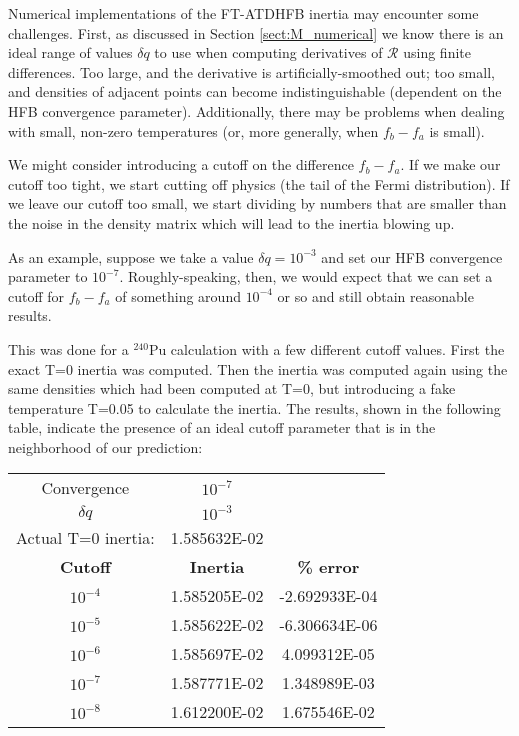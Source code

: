 Numerical implementations of the FT-ATDHFB inertia may encounter some challenges. First,  as discussed in Section \ref{sect:M_numerical} we know there is an ideal range of values $\delta q$ to use when computing derivatives of $\mathcal{R}$ using finite differences. Too large, and the derivative is artificially-smoothed out; too small, and densities of adjacent points can become indistinguishable (dependent on the HFB convergence parameter). Additionally, there may be problems when dealing with small, non-zero temperatures (or, more generally, when $f_b-f_a$ is small).
%
%

We might consider introducing a cutoff on the difference $f_b-f_a$. If we make our cutoff too tight, we start cutting off physics (the tail of the Fermi distribution). If we leave our cutoff too small, we start dividing by numbers that are smaller than the noise in the density matrix which will lead to the inertia blowing up.

As an example, suppose we take a value $\delta q = 10^{-3}$ and set our HFB convergence parameter to $10^{-7}$. Roughly-speaking, then, we would expect that we can set a cutoff for $f_b-f_a$ of something around $10^{-4}$ or so and still obtain reasonable results.

This was done for a $^{240}$Pu calculation with a few different cutoff values. First the exact T=0 inertia was computed. Then the inertia was computed again using the same densities which had been computed at T=0, but introducing a fake temperature T=0.05 to calculate the inertia. The results, shown in the following table, indicate the presence of an ideal cutoff parameter that is in the neighborhood of our prediction:

\begin{tabular}{|ccc|}
	\hline Convergence & $10^{-7}$ &  \\ 
	$\delta q$ & $10^{-3}$ &  \\ 
	Actual T=0 inertia: & 1.585632E-02 &  \\ \hline
	\textbf{Cutoff} & \textbf{Inertia} & \textbf{\% error} \\ \hline
	$10^{-4}$ & 1.585205E-02 & -2.692933E-04 \\
	$10^{-5}$ & 1.585622E-02 & -6.306634E-06 \\
	$10^{-6}$ & 1.585697E-02 & 4.099312E-05 \\
	$10^{-7}$ & 1.587771E-02 & 1.348989E-03 \\
	$10^{-8}$ & 1.612200E-02 & 1.675546E-02 \\ \hline
\end{tabular} 
